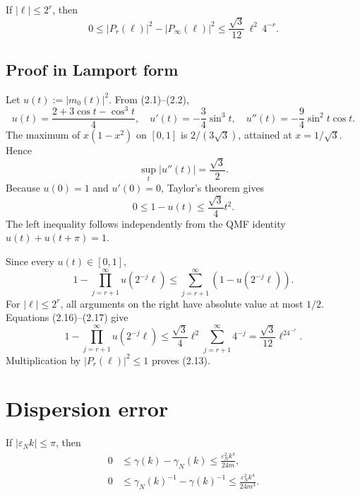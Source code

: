 \documentclass[11pt,a4paper]{article}
\newcommand{\eps}{\varepsilon}
\begin{document}
\begin{lemma}\label{lem:filtertail}
If \(|\ell|\le2^r\), then
\[
 0\le |P_r(\ell)|^2-|P_\infty(\ell)|^2
 \le\frac{\sqrt3}{12}\,\ell^2\,4^{-r}.                         \tag{2.13}
\]
\end{lemma}

\subsection*{Proof in Lamport form}


Let \(u(t):=|m_0(t)|^2\).  From (2.1)--(2.2),
\[
 u(t)=\frac{2+3\cos t-\cos^3t}{4},\quad
 u'(t)=-\frac34\sin^3t,\quad
 u''(t)=-\frac94\sin^2t\cos t.                                \tag{2.14}
\]
The maximum of \(x(1-x^2)\) on \([0,1]\) is
\(2/(3\sqrt3)\), attained at \(x=1/\sqrt3\).  Hence
\[
 \sup_t|u''(t)|=\frac{\sqrt3}{2}.                              \tag{2.15}
\]
Because \(u(0)=1\) and \(u'(0)=0\), Taylor's theorem gives
\[
 0\le1-u(t)\le\frac{\sqrt3}{4}t^2.                             \tag{2.16}
\]
The left inequality follows independently from the QMF identity
\(u(t)+u(t+\pi)=1\).


Since every \(u(t)\in[0,1]\),
\[
 1-\prod_{j=r+1}^\infty u(2^{-j}\ell)
 \le\sum_{j=r+1}^\infty(1-u(2^{-j}\ell)).                      \tag{2.17}
\]
For \(|\ell|\le2^r\), all arguments on the right have absolute value at most
\(1/2\).  Equations (2.16)--(2.17) give
\[
 1-\prod_{j=r+1}^\infty u(2^{-j}\ell)
 \le\frac{\sqrt3}{4}\ell^2\sum_{j=r+1}^\infty4^{-j}
 =\frac{\sqrt3}{12}\ell^24^{-r}.                              \tag{2.18}
\]
Multiplication by \(|P_r(\ell)|^2\le1\) proves (2.13).
\QedStep

\section{Dispersion error}

\begin{lemma}\label{lem:dispersion}
If \(|\eps_Nk|\le\pi\), then
\begin{align}
 0&\le\gamma(k)-\gamma_N(k)
 \le\frac{\eps_N^2k^4}{24m},                                  \tag{3.1}\\
 0&\le\gamma_N(k)^{-1}-\gamma(k)^{-1}
 \le\frac{\eps_N^2k^4}{24m^3}.                                \tag{3.2}
\end{align}
\end{lemma}
\end{document}
